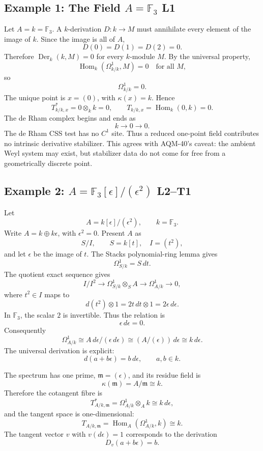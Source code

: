 \subsection{Example 1: The Field \texorpdfstring{\(A=\mathbb F_3\)}{A=F3} L1}

Let \(A=k=\mathbb F_3\).  A \(k\)-derivation \(D:k\to M\) must annihilate every
element of the image of \(k\).  Since the image is all of \(A\),
\[
  D(0)=D(1)=D(2)=0.
\]
Therefore \(\operatorname{Der}_k(k,M)=0\) for every \(k\)-module \(M\).
By the universal property,
\[
  \operatorname{Hom}_k(\Omega^1_{k/k},M)=0
  \quad\text{for all }M,
\]
so
\[
  \Omega^1_{k/k}=0.
\]
The unique point is \(x=(0)\), with \(\kappa(x)=k\).  Hence
\[
  T^*_{k/k,x}=0\otimes_k k=0,\qquad
  T_{k/k,x}=\operatorname{Hom}_k(0,k)=0.
\]
The de Rham complex begins and ends as
\[
  k\longrightarrow0\longrightarrow0.
\]
The de Rham CSS test has no \(C^1\) site.  Thus a reduced one-point field
contributes no intrinsic derivative stabilizer.  This agrees with AQM-40's
caveat: the ambient Weyl system may exist, but stabilizer data do not come for
free from a geometrically discrete point.

\subsection{Example 2: \texorpdfstring{\(A=\mathbb F_3[\epsilon]/(\epsilon^2)\)}{A=F3[epsilon]/epsilon2} L2--T1}

Let
\[
  A=k[\epsilon]/(\epsilon^2),\qquad k=\mathbb F_3.
\]
Write \(A=k\oplus k\epsilon\), with \(\epsilon^2=0\).  Present \(A\) as
\[
  S/I,\qquad S=k[t],\quad I=(t^2),
\]
and let \(\epsilon\) be the image of \(t\).  The Stacks polynomial-ring lemma
gives
\[
  \Omega^1_{S/k}=S\,dt.
\]
The quotient exact sequence gives
\[
  I/I^2\longrightarrow \Omega^1_{S/k}\otimes_S A
  \longrightarrow \Omega^1_{A/k}\longrightarrow0,
\]
where \(t^2\in I\) maps to
\[
  d(t^2)\otimes1=2t\,dt\otimes1=2\epsilon\,d\epsilon.
\]
In \(\mathbb F_3\), the scalar \(2\) is invertible.  Thus the relation is
\[
  \epsilon\,d\epsilon=0.
\]
Consequently
\[
  \Omega^1_{A/k}\cong A\,d\epsilon/(\epsilon\,d\epsilon)
  \cong (A/(\epsilon))\,d\epsilon
  \cong k\,d\epsilon.
\]
The universal derivation is explicit:
\[
  d(a+b\epsilon)=b\,d\epsilon,\qquad a,b\in k.
\]

The spectrum has one prime, \(\mathfrak m=(\epsilon)\), and its residue field
is
\[
  \kappa(\mathfrak m)=A/\mathfrak m\cong k.
\]
Therefore the cotangent fibre is
\[
  T^*_{A/k,\mathfrak m}
  =
  \Omega^1_{A/k}\otimes_A k
  \cong k\,d\epsilon,
\]
and the tangent space is one-dimensional:
\[
  T_{A/k,\mathfrak m}
  =
  \operatorname{Hom}_A(\Omega^1_{A/k},k)
  \cong k.
\]
The tangent vector \(v\) with \(v(d\epsilon)=1\) corresponds to the derivation
\[
  D_v(a+b\epsilon)=b.
\]

